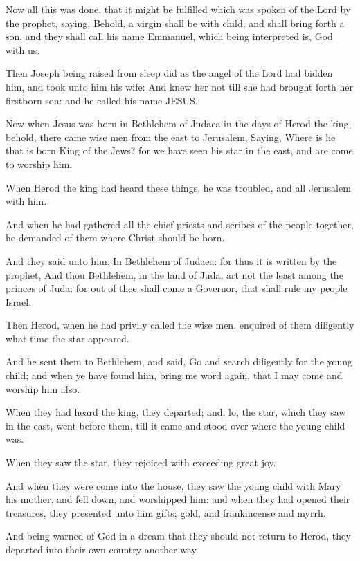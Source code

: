 \Verse Now all this was done, that it might be fulfilled which was spoken of the Lord by the prophet, saying, \Verse Behold, a virgin shall be with child, and shall bring forth a son, and they shall call his name Emmanuel, which being interpreted is, God with us.

\Verse Then Joseph being raised from sleep did as the angel of the Lord had bidden him, and took unto him his wife: \Verse And knew her not till she had brought forth her firstborn son: and he called his name JESUS.


\Chapter
\Verse Now when Jesus was born in Bethlehem of Judaea in the days of Herod the king, behold, there came wise men from the east to Jerusalem, \Verse Saying, Where is he that is born King of the Jews? for we have seen his star in the east, and are come to worship him.

\Verse When Herod the king had heard these things, he was troubled, and all Jerusalem with him.

\Verse And when he had gathered all the chief priests and scribes of the people together, he demanded of them where Christ should be born.

\Verse And they said unto him, In Bethlehem of Judaea: for thus it is written by the prophet, \Verse And thou Bethlehem, in the land of Juda, art not the least among the princes of Juda: for out of thee shall come a Governor, that shall rule my people Israel.

\Verse Then Herod, when he had privily called the wise men, enquired of them diligently what time the star appeared.

\Verse And he sent them to Bethlehem, and said, Go and search diligently for the young child; and when ye have found him, bring me word again, that I may come and worship him also.

\Verse When they had heard the king, they departed; and, lo, the star, which they saw in the east, went before them, till it came and stood over where the young child was.

\Verse When they saw the star, they rejoiced with exceeding great joy.

\Verse And when they were come into the house, they saw the young child with Mary his mother, and fell down, and worshipped him: and when they had opened their treasures, they presented unto him gifts; gold, and frankincense and myrrh.

\Verse And being warned of God in a dream that they should not return to Herod, they departed into their own country another way.

